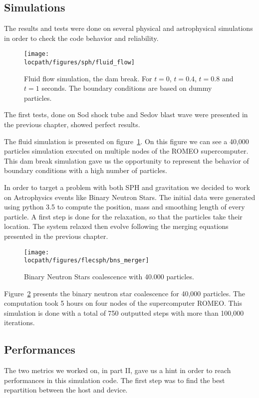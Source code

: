 \subsection{Simulations}
The results and tests were done on several physical and astrophysical simulations in order to check the code behavior and reliability. 
\begin{figure}[t!]
\centering
\texttt{[image: \\locpath/figures/sph/fluid\_flow]}
\caption[3D Fluid flow simulation using FleCSPH]{Fluid flow simulation, the dam break. For $t=0$, $t=0.4$, $t=0.8$ and $t=1$ seconds. The boundary conditions are based on dummy particles. }
\label{fig:fluid_simulation}
\end{figure}

The first tests, done on Sod shock tube and Sedov blast wave were presented in the previous chapter, showed perfect results. 

The fluid simulation is presented on figure~\ref{fig:fluid_simulation}.
On this figure we can see a 40,000 particles simulation executed on multiple nodes of the ROMEO supercomputer. 
This dam break simulation gave us the opportunity to represent the behavior of boundary conditions with a high number of particles. 

In order to target a problem with both SPH and gravitation we decided to work on Astrophysics events like Binary Neutron Stars.
The initial data were generated using python 3.5 to compute the position, mass and smoothing length of every particle. 
A first step is done for the relaxation, so that the particles take their location. 
The system relaxed then evolve following the merging equations presented in the previous chapter. 
\begin{figure}[t!]
\centering
\texttt{[image: \\locpath/figures/flecsph/bns\_merger]}
\caption[Binary Neutron Star coalescence using FleCSPH]{Binary Neutron Stars coalescence with 40.000 particles.}
\label{fig:bns_simulation}
\end{figure}

Figure~\ref{fig:bns_simulation} presents the binary neutron star coalescence for 40,000 particles. 
The computation took 5 hours on four nodes of the supercomputer ROMEO. 
This simulation is done with a total of 750 outputted steps with more than 100,000 iterations. 


\subsection{Performances}
The two metrics we worked on, in part II, gave us a hint in order to reach performances in this simulation code. 
The first step was to find the best repartition between the host and device.


